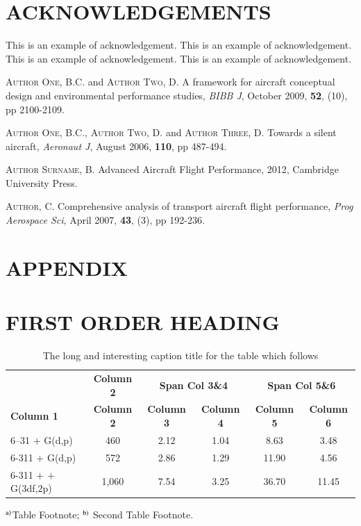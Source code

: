 \documentclass{isabec} %
\begin{document}
\vspace*{-15pt}
\section*{ACKNOWLEDGEMENTS}
This is an example of acknowledgement\cite{author1,author2}. This is an example of acknowledgement\cite{author3}. This is an example of acknowledgement. This is an example of acknowledgement\cite{author4}.

\begin{thebibliography}{0}%
\textsc{Author One, B.C.} and \textsc{Author Two, D.} A framework for aircraft conceptual design and environmental performance studies, \textit{BIBB J}, October 2009, \textbf{52}, (10), pp 2100-2109.

\textsc{Author One, B.C.}, \textsc{Author Two, D.} and \textsc{Author Three, D.} Towards a silent aircraft, \textit{Aeronaut J}, August 2006, \textbf{110}, pp 487-494.

\textsc{Author Surname, B.} Advanced Aircraft Flight Performance, 2012, Cambridge University Press.

\textsc{Author, C.} Comprehensive analysis of transport aircraft flight performance, \textit{Prog Aerospace Sci}, April
2007, \textbf{43}, (3), pp 192-236.

\end{thebibliography}

\setcounter{section}{0}
\section*{APPENDIX}
\section{FIRST ORDER HEADING}

\begin{table}[h]
\caption{The long and interesting caption title for the table which follows}
\label{tab4}
\centering
\begin{tabular}{@{}lccccc@{}}
&{\bf Column 2}&\multicolumn{2}{c}{{\bf Span Col 3\&4}} &\multicolumn{2}{c}{{\bf Span Col 5\&6}}\\
{\bf Column 1} &{\bf Column 2} &{\bf Column 3} &{\bf Column 4} &{\bf Column 5} &{\bf Column 6}\\[6pt]
6--31 $+$ G(d,p) &460 &2.12 &1.04 &8.63 &3.48\\
6-311 $+$ G(d,p) &572 &2.86 &1.29 &11.90 &4.56\\
6-311 $+$ $+$ G(3df,2p) &1,060 &7.54 &3.25 &36.70 &11.45\\
\end{tabular}
\begin{tabnote}
$^{\rm a)}$Table Footnote; $^{\rm b)}$ Second Table Footnote.
\end{tabnote}
\end{table}

\end{document}

